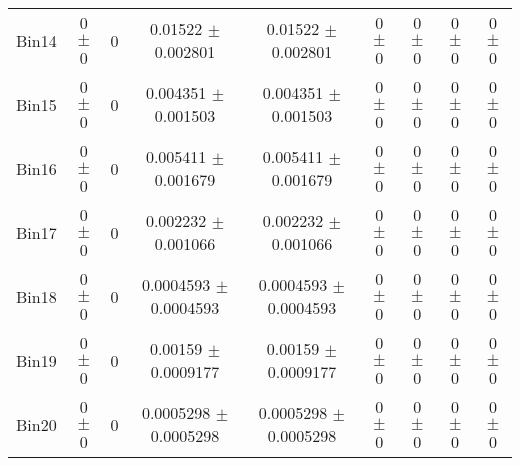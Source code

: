 \begin{tabular}{@{\extracolsep{4pt}}lcccccccc@{}}
     Bin14 & 0 $\pm$ 0 & 0 & 0.01522 $\pm$ 0.002801 & 0.01522 $\pm$ 0.002801 & 0 $\pm$ 0 & 0 $\pm$ 0 & 0 $\pm$ 0 & 0 $\pm$ 0 \\ 
     Bin15 & 0 $\pm$ 0 & 0 & 0.004351 $\pm$ 0.001503 & 0.004351 $\pm$ 0.001503 & 0 $\pm$ 0 & 0 $\pm$ 0 & 0 $\pm$ 0 & 0 $\pm$ 0 \\ 
     Bin16 & 0 $\pm$ 0 & 0 & 0.005411 $\pm$ 0.001679 & 0.005411 $\pm$ 0.001679 & 0 $\pm$ 0 & 0 $\pm$ 0 & 0 $\pm$ 0 & 0 $\pm$ 0 \\ 
     Bin17 & 0 $\pm$ 0 & 0 & 0.002232 $\pm$ 0.001066 & 0.002232 $\pm$ 0.001066 & 0 $\pm$ 0 & 0 $\pm$ 0 & 0 $\pm$ 0 & 0 $\pm$ 0 \\ 
     Bin18 & 0 $\pm$ 0 & 0 & 0.0004593 $\pm$ 0.0004593 & 0.0004593 $\pm$ 0.0004593 & 0 $\pm$ 0 & 0 $\pm$ 0 & 0 $\pm$ 0 & 0 $\pm$ 0 \\ 
     Bin19 & 0 $\pm$ 0 & 0 & 0.00159 $\pm$ 0.0009177 & 0.00159 $\pm$ 0.0009177 & 0 $\pm$ 0 & 0 $\pm$ 0 & 0 $\pm$ 0 & 0 $\pm$ 0 \\ 
     Bin20 & 0 $\pm$ 0 & 0 & 0.0005298 $\pm$ 0.0005298 & 0.0005298 $\pm$ 0.0005298 & 0 $\pm$ 0 & 0 $\pm$ 0 & 0 $\pm$ 0 & 0 $\pm$ 0 \\ 
\hline\hline
  \end{tabular}
